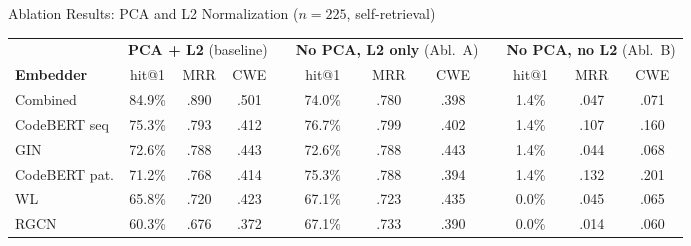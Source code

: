 \documentclass[aspectratio=169,10pt]{beamer}
\newcommand{\chit}[1]{\cellcolor{hit!30} #1}
\newcommand{\cmiss}[1]{\cellcolor{miss!25} #1}
\newcommand{\cwarn}[1]{\cellcolor{warn!30} #1}
\begin{document}
\begin{frame}{Ablation Results: PCA and L2 Normalization ($n{=}225$, self-retrieval)}

  \centering
  \vspace{0.2em}
  {\small
  \renewcommand{\arraystretch}{1.35}
  \setlength{\tabcolsep}{5pt}
  \begin{tabular}{l *{3}{c} c *{3}{c} c *{3}{c}}
    \toprule
    & \multicolumn{3}{c}{\textbf{PCA + L2} {\footnotesize(baseline)}}
    && \multicolumn{3}{c}{\textbf{No PCA, L2 only} {\footnotesize(Abl.\ A)}}
    && \multicolumn{3}{c}{\textbf{No PCA, no L2} {\footnotesize(Abl.\ B)}} \\
    \cmidrule{2-4} \cmidrule{6-8} \cmidrule{10-12}
    \textbf{Embedder}
      & hit@1 & MRR & CWE
      && hit@1 & MRR & CWE
      && hit@1 & MRR & CWE \\
    \midrule
    \rowcolor{c1!12}
    Combined
      & \chit{84.9\%} & \chit{.890} & \chit{.501}
      && \cwarn{74.0\%} & .780 & .398
      && \cmiss{1.4\%} & .047 & .071 \\
    CodeBERT seq
      & 75.3\% & .793 & .412
      && 76.7\% & .799 & .402
      && \cmiss{1.4\%} & .107 & .160 \\
    GIN
      & 72.6\% & .788 & .443
      && 72.6\% & .788 & .443
      && \cmiss{1.4\%} & .044 & .068 \\
    CodeBERT pat.
      & 71.2\% & .768 & .414
      && 75.3\% & .788 & .394
      && \cmiss{1.4\%} & .132 & .201 \\
    WL
      & 65.8\% & .720 & .423
      && 67.1\% & .723 & .435
      && \cmiss{0.0\%} & .045 & .065 \\
    RGCN
      & 60.3\% & .676 & .372
      && \cwarn{67.1\%} & .733 & .390
      && \cmiss{0.0\%} & .014 & .060 \\
    \bottomrule
  \end{tabular}}


\end{frame}
\end{document}
